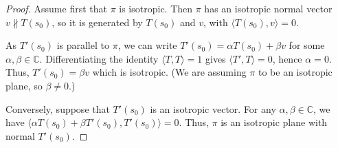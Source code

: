 \documentclass[10pt,a4paper]{amsart}
\begin{document}
\begin{proof}
Assume first that $\pi$ is isotropic. Then $\pi$ has an isotropic normal vector 
$v\nparallel T(s_0)$, so it is generated by $T(s_0)$ and
$v$, with $\langle T(s_0),v\rangle=0$. 

As $T'(s_0)$ is parallel to $\pi$, we can write $T'(s_0)=\alpha T(s_0)+\beta v$ for some $\alpha,\beta\in \mathbb C$.
Differentiating the identity $\langle T,{T}\rangle=1$ gives 
 $\langle T',T\rangle=0$, hence $\alpha=0$. Thus, $T'(s_0)=\beta v$ 
 which is isotropic. 
(We are assuming $\pi$ to be an isotropic plane, so $\beta\ne 0$.)
 
Conversely, suppose that $T'(s_0)$ is an isotropic vector. For any 
$\alpha,\beta\in \mathbb C$, we have $\langle \alpha T(s_0)+\beta T'(s_0),T'(s_0)\rangle=0$.
Thus, $\pi$ is an isotropic plane with normal $T'(s_0)$.
\end{proof}
\end{document}
